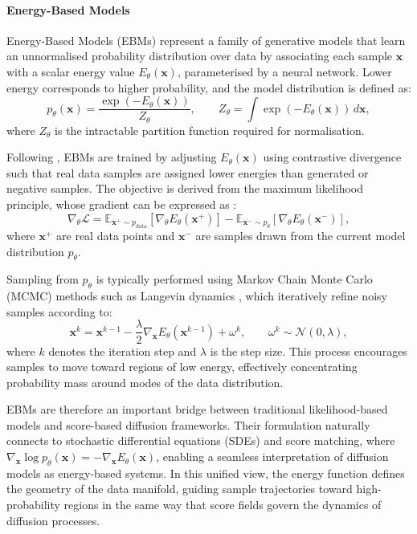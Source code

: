 \paragraph{Energy-Based Models}
Energy-Based Models (EBMs) represent a family of generative models that learn an unnormalised probability distribution over data by associating each sample $\mathbf{x}$ with a scalar energy value $E_\theta(\mathbf{x})$, parameterised by a neural network. 
Lower energy corresponds to higher probability, and the model distribution is defined as:
\begin{equation}
    p_\theta(\mathbf{x}) = \frac{\exp(-E_\theta(\mathbf{x}))}{Z_\theta}, \qquad Z_\theta = \int \exp(-E_\theta(\mathbf{x}))\, d\mathbf{x},
\end{equation}
where $Z_\theta$ is the intractable partition function required for normalisation.

Following \citet{NEURIPS2019_378a063b}, EBMs are trained by adjusting $E_\theta(\mathbf{x})$ using contrastive divergence \citep{product_of_experts} such that real data samples are assigned lower energies than generated or negative samples. 
The objective is derived from the maximum likelihood principle, whose gradient can be expressed as \citep{NEURIPS2020_49856ed4}:
\begin{equation}
    \nabla_\theta \mathcal{L} = 
    \mathbb{E}_{\mathbf{x}^+ \sim p_{\text{data}}}[\nabla_\theta E_\theta(\mathbf{x}^+)]
    - \mathbb{E}_{\mathbf{x}^- \sim p_\theta}[\nabla_\theta E_\theta(\mathbf{x}^-)],
\end{equation}
where $\mathbf{x}^+$ are real data points and $\mathbf{x}^-$ are samples drawn from the current model distribution $p_\theta$.

Sampling from $p_\theta$ is typically performed using Markov Chain Monte Carlo (MCMC) methods such as Langevin dynamics \citep{bayesian_learning_sgld}, which iteratively refine noisy samples according to:
\begin{equation}
    \mathbf{x}^{k} = \mathbf{x}^{k-1} - \frac{\lambda}{2}\nabla_{\mathbf{x}} E_\theta(\mathbf{x}^{k-1}) + \omega^{k}, \qquad \omega^{k} \sim \mathcal{N}(0, \lambda),
\end{equation}
where $k$ denotes the iteration step and $\lambda$ is the step size. 
This process encourages samples to move toward regions of low energy, effectively concentrating probability mass around modes of the data distribution.

EBMs are therefore an important bridge between traditional likelihood-based models and score-based diffusion frameworks. 
Their formulation naturally connects to stochastic differential equations (SDEs) and score matching, where $\nabla_\mathbf{x} \log p_\theta(\mathbf{x}) = -\nabla_\mathbf{x} E_\theta(\mathbf{x})$, enabling a seamless interpretation of diffusion models as energy-based systems. 
In this unified view, the energy function defines the geometry of the data manifold, guiding sample trajectories toward high-probability regions in the same way that score fields govern the dynamics of diffusion processes.
